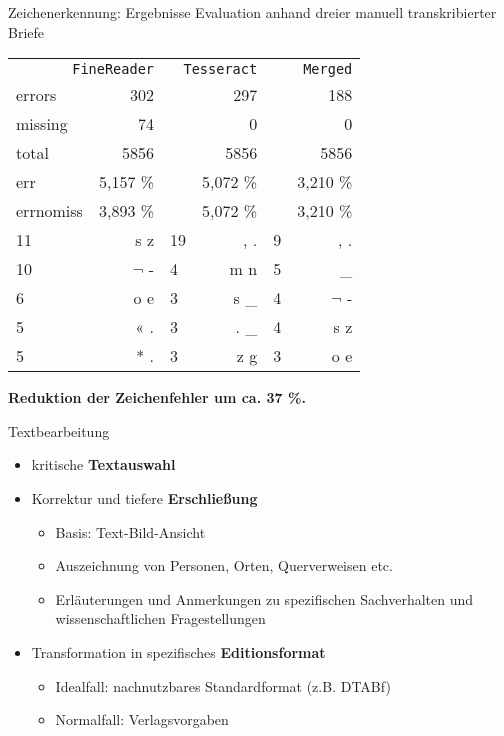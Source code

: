 \documentclass{bbawslides}
\begin{document}
\begin{bbawslide}{Zeichenerkennung: Ergebnisse}
  \vspace*{7mm}%
  \centerslidestrue%
  Evaluation anhand dreier manuell transkribierter Briefe \\
  \begin{tabular}{lr|lr|lr}
  \multicolumn{2}{r|}{\texttt{FineReader}} & \multicolumn{2}{r|}{\texttt{Tesseract}} & \multicolumn{2}{r}{\texttt{Merged}} \\
  errors    &     302  & & 297 & & 188\\
  missing   &      74  & & 0 & & 0\\
  total     &    5856 & & 5856 & & 5856\\
  err       &   5,157 \% & & 5,072 \% & & 3,210 \% \\
  errnomiss &   3,893 \% & & 5,072 \% & & 3,210 \% \\
  11        &   s	z  & 19 & , . & 9 & , .\\
  10        &   $\neg$	- & 4 & m n & 5 & \_ \\
   6	      &   o	e  & 3 & s \_ & 4 & $\neg$ - \\
   5	      &   «	. & 3 & . \_ & 4 & s z \\
   5	      &   *	. & 3 & z g & 3 & o e \\
  \end{tabular}
  \begin{minipage}{0.2\textwidth}
  \textbf{Reduktion der Zeichenfehler um ca. 37 \%.}
  \end{minipage}
\end{bbawslide}

\begin{bbawslide}{Textbearbeitung}
  \vspace*{7mm}%
  \centerslidestrue%
  \begin{itemize}
     \item kritische \textbf{Textauswahl}
     \item Korrektur und tiefere \textbf{Erschließung}
     \begin{itemize}
       \item Basis: Text-Bild-Ansicht
       \item Auszeichnung von Personen, Orten, Querverweisen etc.
       \item Erläuterungen und Anmerkungen zu spezifischen Sachverhalten und wissenschaftlichen Fragestellungen
     \end{itemize}
     \item Transformation in spezifisches \textbf{Editionsformat}
     \begin{itemize}
       \item Idealfall: nachnutzbares Standardformat (z.B. DTABf)
       \item Normalfall: Verlagsvorgaben
     \end{itemize}
  \end{itemize}
\end{bbawslide}
\end{document}
